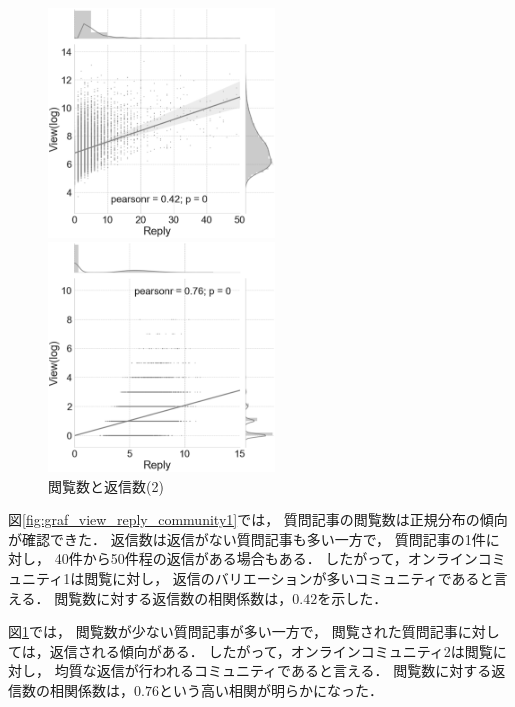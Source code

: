 \documentclass[12pt,a4paper,twocolumn,twoside]{jsik}
\begin{document}
\begin{figure}[htb]
  \begin{center}
    \includegraphics[width=6cm]{./eps/jointplot_view_reply.eps}
    \caption{閲覧数と返信数(1)}
    \label{fig:graf_view_reply_community1}
  \end{center}
  \begin{center}
    \includegraphics[width=6cm]{./eps/jointplot_view_reply_stackoverflow.eps}
    \caption{閲覧数と返信数(2)}
    \label{fig:graf_view_reply_stackoverflow}
  \end{center}
\end{figure}


図\ref{fig:graf_view_reply_community1}では，
質問記事の閲覧数は正規分布の傾向が確認できた．
%
返信数は返信がない質問記事も多い一方で，
質問記事の1件に対し，
40件から50件程の返信がある場合もある．
%
したがって，オンラインコミュニティ1は閲覧に対し，
返信のバリエーションが多いコミュニティであると言える．
閲覧数に対する返信数の相関係数は，$0.42$を示した．

図\ref{fig:graf_view_reply_stackoverflow}では，
閲覧数が少ない質問記事が多い一方で，
閲覧された質問記事に対しては，返信される傾向がある．
%
したがって，オンラインコミュニティ2は閲覧に対し，
均質な返信が行われるコミュニティであると言える．
閲覧数に対する返信数の相関係数は，$0.76$という高い相関が明らかになった．
\end{document}

